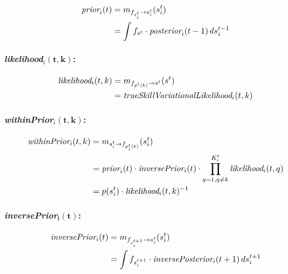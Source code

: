 \documentclass[article]{jss}
\begin{document}
 \begin{equation}
 \begin{split}
  \emph{prior}_i(t) &= m_{f_{s_i^t} \rightarrow s_i^t}(s_i^t) \\
  &= \int f_{s^t} \cdot \emph{posterior}_i(t-1) \, ds_i^{t-1}
  \end{split}
 \end{equation}

 \paragraph{\emph{likelihood}$_i\bm{(t,k)}$:}

 \begin{equation}
 \begin{split}
  \emph{likelihood}_i(t,k) &= m_{f_{p^{t}(k)} \rightarrow s^t}(s^t) \\
  &= \emph{trueSkillVariationalLikelihood}_i(t,k)
  \end{split}
 \end{equation}

 \paragraph{\emph{withinPrior}$_i\bm{(t,k)}$:}


 \begin{equation}
 \begin{split}
 \emph{withinPrior}_i(t,k) &= m_{s_i^t \rightarrow f_{p_i^t(k)}}(s_i^t)  \\
 &= \emph{prior}_i(t) \cdot \emph{inversePrior}_i(t) \cdot \prod_{q=1, q\neq k}^{K_i^t} \emph{likelihood}_i(t,q) \\
 &= p(s_i^t) \cdot \emph{likelihood}_i(t,k)^{-1}
  \end{split}
 \end{equation}

 \paragraph{\emph{inversePrior}$\bm{_i(t)}$: }

 \begin{equation}
 \begin{split}
 \emph{inversePrior}_i(t) &= m_{f_{s_i^{t+1}} \rightarrow s_i^t}(s_i^t) \\
 &= \int f_{s_i^{t+1}} \cdot \emph{inversePosterior}_i(t+1) \, ds_i^{t+1}
 \end{split}
 \end{equation}
\end{document}
